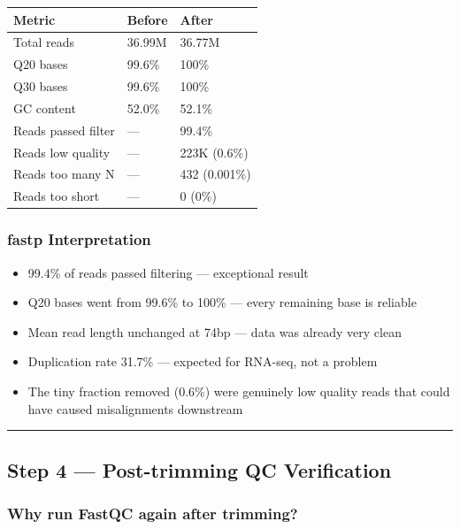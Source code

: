 \documentclass[
]{article}
\providecommand{\tightlist}{%
  \setlength{\itemsep}{0pt}\setlength{\parskip}{0pt}}
\begin{document}
\begin{longtable}[]{@{}lll@{}}
\toprule\noalign{}
Metric & Before & After \\
\midrule\noalign{}
\endhead
\bottomrule\noalign{}
\endlastfoot
Total reads & 36.99M & 36.77M \\
Q20 bases & 99.6\% & 100\% \\
Q30 bases & 99.6\% & 100\% \\
GC content & 52.0\% & 52.1\% \\
Reads passed filter & --- & 99.4\% \\
Reads low quality & --- & 223K (0.6\%) \\
Reads too many N & --- & 432 (0.001\%) \\
Reads too short & --- & 0 (0\%) \\
\end{longtable}

\subsubsection{fastp Interpretation}\label{fastp-interpretation}

\begin{itemize}
\tightlist
\item
  99.4\% of reads passed filtering --- exceptional result
\item
  Q20 bases went from 99.6\% to 100\% --- every remaining base is
  reliable
\item
  Mean read length unchanged at 74bp --- data was already very clean
\item
  Duplication rate 31.7\% --- expected for RNA-seq, not a problem
\item
  The tiny fraction removed (0.6\%) were genuinely low quality reads
  that could have caused misalignments downstream
\end{itemize}

\begin{center}\rule{0.5\linewidth}{0.5pt}\end{center}

\subsection{Step 4 --- Post-trimming QC
Verification}\label{step-4-post-trimming-qc-verification}

\subsubsection{Why run FastQC again after
trimming?}\label{why-run-fastqc-again-after-trimming}
\end{document}
